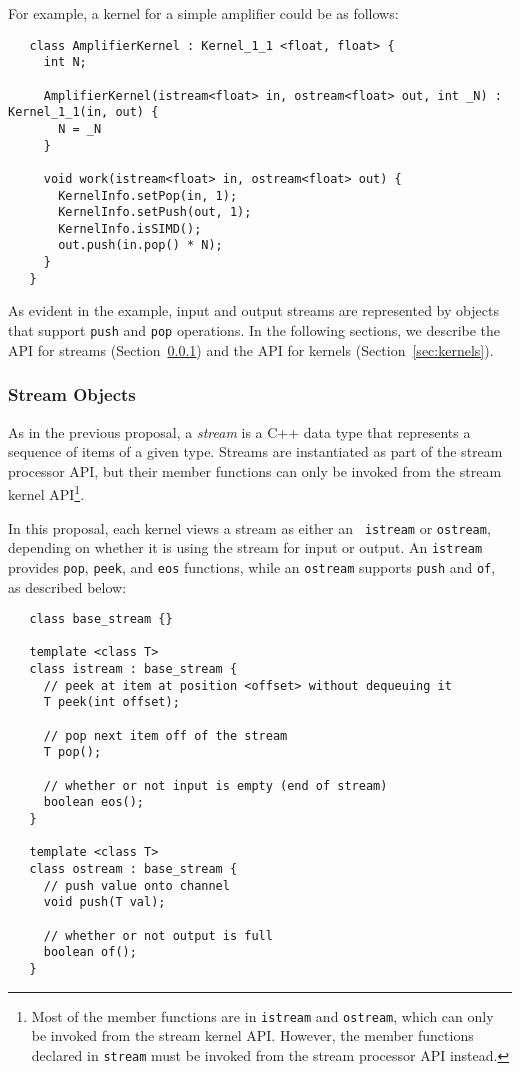 For example, a kernel for a simple amplifier could be as follows:
\begin{verbatim}
   class AmplifierKernel : Kernel_1_1 <float, float> {
     int N;

     AmplifierKernel(istream<float> in, ostream<float> out, int _N) : Kernel_1_1(in, out) {
       N = _N
     }

     void work(istream<float> in, ostream<float> out) {
       KernelInfo.setPop(in, 1);
       KernelInfo.setPush(out, 1);
       KernelInfo.isSIMD();
       out.push(in.pop() * N);
     }
   }  
\end{verbatim}
As evident in the example, input and output streams are represented by
objects that support {\tt push} and {\tt pop} operations.  In the
following sections, we describe the API for streams
(Section~\ref{sec:kerstreams}) and the API for kernels
(Section~\ref{sec:kernels}).

\subsubsection{Stream Objects}
\label{sec:kerstreams}

As in the previous proposal, a {\it stream} is a C++ data type that
represents a sequence of items of a given type.  Streams are
instantiated as part of the stream processor API, but their member
functions can only be invoked from the stream kernel API\footnote{Most
of the member functions are in {\tt istream} and {\tt ostream}, which
can only be invoked from the stream kernel API.  However, the member
functions declared in {\tt stream} must be invoked from the stream
processor API instead.}.

In this proposal, each kernel views a stream as either an {\tt
istream} or {\tt ostream}, depending on whether it is using the stream
for input or output.  An {\tt istream} provides {\tt pop}, {\tt peek},
and {\tt eos} functions, while an {\tt ostream} supports {\tt push}
and {\tt of}, as described below:
\begin{verbatim}
   class base_stream {}

   template <class T>
   class istream : base_stream {
     // peek at item at position <offset> without dequeuing it
     T peek(int offset);

     // pop next item off of the stream
     T pop();

     // whether or not input is empty (end of stream)
     boolean eos();
   }

   template <class T>
   class ostream : base_stream {
     // push value onto channel
     void push(T val);

     // whether or not output is full
     boolean of();
   }  
\end{verbatim}


